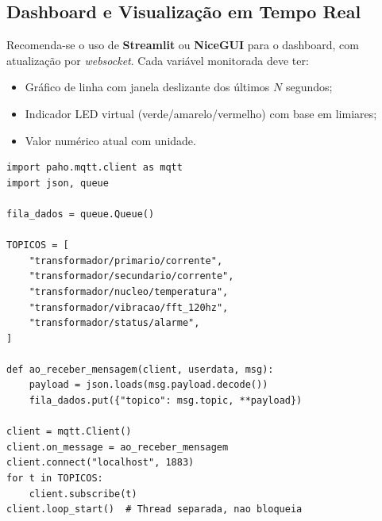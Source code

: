 \documentclass[12pt, a4paper]{article}
\begin{document}
\begin{center}
\end{center}

\subsection{Dashboard e Visualização em Tempo Real}

Recomenda-se o uso de \textbf{Streamlit} ou \textbf{NiceGUI} para o dashboard, com atualização por \textit{websocket}. Cada variável monitorada deve ter:

\begin{itemize}[leftmargin=2cm]
    \item Gráfico de linha com janela deslizante dos últimos $N$ segundos;
    \item Indicador LED virtual (verde/amarelo/vermelho) com base em limiares;
    \item Valor numérico atual com unidade.
\end{itemize}

\begin{lstlisting}[style=python, caption={Subscriber MQTT com fila}]
import paho.mqtt.client as mqtt
import json, queue

fila_dados = queue.Queue()

TOPICOS = [
    "transformador/primario/corrente",
    "transformador/secundario/corrente",
    "transformador/nucleo/temperatura",
    "transformador/vibracao/fft_120hz",
    "transformador/status/alarme",
]

def ao_receber_mensagem(client, userdata, msg):
    payload = json.loads(msg.payload.decode())
    fila_dados.put({"topico": msg.topic, **payload})

client = mqtt.Client()
client.on_message = ao_receber_mensagem
client.connect("localhost", 1883)
for t in TOPICOS:
    client.subscribe(t)
client.loop_start()  # Thread separada, nao bloqueia
\end{lstlisting}
\end{document}
